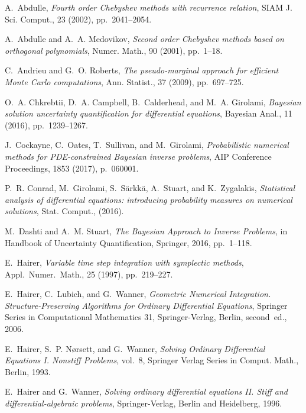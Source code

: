 \documentclass[10pt]{article}
\begin{document}
\def\cprime{$'$}
\begin{thebibliography}{10}
	
	{\sc A.~Abdulle}, {\em Fourth order {C}hebyshev methods with recurrence
		relation}, SIAM J. Sci. Comput., 23 (2002), pp.~2041--2054.
	
	{\sc A.~Abdulle and A.~A. Medovikov}, {\em Second order {C}hebyshev methods
		based on orthogonal polynomials}, Numer. Math., 90 (2001), pp.~1--18.
	
	{\sc C.~Andrieu and G.~O. Roberts}, {\em The pseudo-marginal approach for
		efficient {M}onte {C}arlo computations}, Ann. Statist., 37 (2009),
	pp.~697--725.
	
	{\sc O.~A. Chkrebtii, D.~A. Campbell, B.~Calderhead, and M.~A. Girolami}, {\em
		Bayesian solution uncertainty quantification for differential equations},
	Bayesian Anal., 11 (2016), pp.~1239--1267.
	
	{\sc J.~Cockayne, C.~Oates, T.~Sullivan, and M.~Girolami}, {\em Probabilistic
		numerical methods for {PDE}-constrained {B}ayesian inverse problems}, AIP
	Conference Proceedings, 1853 (2017), p.~060001.
	
	{\sc P.~R. Conrad, M.~Girolami, S.~S{\"a}rkk{\"a}, A.~Stuart, and
		K.~Zygalakis}, {\em Statistical analysis of differential equations:
		introducing probability measures on numerical solutions}, Stat. Comput.,
	(2016).
	
	{\sc M.~Dashti and A.~M. Stuart}, {\em The {B}ayesian {A}pproach to {I}nverse
		{P}roblems}, in Handbook of Uncertainty Quantification, Springer, 2016,
	pp.~1--118.
	
	{\sc E.~Hairer}, {\em Variable time step integration with symplectic methods},
	Appl.\ Numer.\ Math., 25 (1997), pp.~219--227.
	
	{\sc E.~Hairer, C.~Lubich, and G.~Wanner}, {\em Geometric Numerical
		Integration. Structure-Preserving Algorithms for Ordinary Differential
		Equations}, Springer Series in Computational Mathematics 31, Springer-Verlag,
	Berlin, second~ed., 2006.
	
	{\sc E.~Hairer, S.~P. N{\o{}}rsett, and G.~Wanner}, {\em Solving Ordinary
		Differential Equations I. Nonstiff Problems}, vol.~8, Springer Verlag Series
	in Comput. Math., Berlin, 1993.
	
	{\sc E.~Hairer and G.~Wanner}, {\em Solving ordinary differential equations II.
		Stiff and differential-algebraic problems}, Springer-Verlag, Berlin and
	Heidelberg, 1996.
	

\end{thebibliography}
\end{document}
